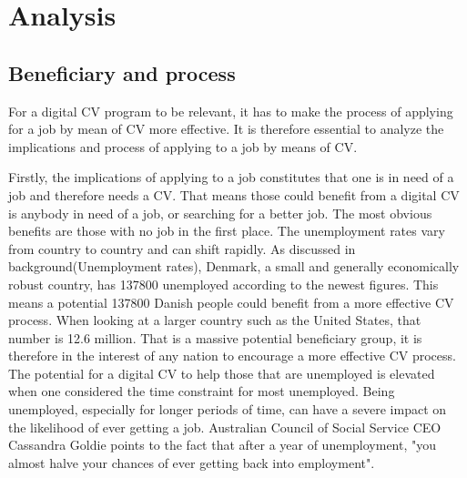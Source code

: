 \section{Analysis}\label{sec:analysis}

\subsection{Beneficiary and process}
For a digital CV program to be relevant, it has to make the process of applying for a job by mean of CV more effective.  
It is therefore essential to analyze the implications and process of applying to a job by means of CV.

Firstly, the implications of applying to a job constitutes that one is in need of a job and therefore needs a CV.
That means those could benefit from a digital CV is anybody in need of a job, or searching for a better job. 
The most obvious benefits are those with no job in the first place. 
The unemployment rates vary from country to country and can shift rapidly.
As discussed in background(Unemployment rates), Denmark, a small and generally economically robust country, has 137800 unemployed according to the newest figures. 
This means a potential 137800 Danish people could benefit from a more effective CV process. 
When looking at a larger country such as the United States, that number is 12.6 million.
That is a massive potential beneficiary group, it is therefore in the interest of any nation to encourage a more effective CV process.
The potential for a digital CV to help those that are unemployed is elevated when one considered the time constraint for most unemployed.
Being unemployed, especially for longer periods of time, can have a severe impact on the likelihood of ever getting a job.
Australian Council of Social Service CEO Cassandra Goldie points to the fact that after a year of unemployment, "you almost halve your chances of ever getting back into employment".

